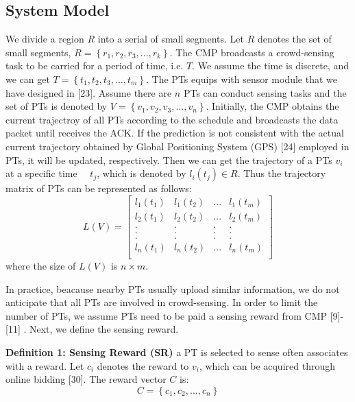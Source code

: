\documentclass[journal]{IEEEtran}
\begin{document}
\subsection{System Model }
 We divide a region $R$ into a serial of small segments. Let $R$ denotes the set of small segments, $R=\left \{ r_{1},r_{2},r_{3},...,r_{k} \right \}$. The CMP broadcasts a crowd-sensing task to be carried for a period of time, i.e. $T$. We assume the time is discrete, and we can get $T=\left \{ t_{1},t_{2},t_{3},...,t_{m} \right \}$. The PTs equips with sensor module that we have designed in [23]. Assume there are $n$ PTs can conduct sensing tasks and the set of PTs is denoted by $V=\left \{ v_{1},v_{2},v_{3},...,v_{n}\right \}$. Initially, the CMP obtains the current trajectroy of all PTs according to the schedule and broadcasts the data packet until receives the ACK. If the prediction is not consistent with the actual current trajectory obtained by Global Positioning System (GPS) [24] employed in PTs, it will be updated, respectively. Then we can get the trajectory of a PTs $v_{i}$ at a specific time　 $t_{j}$, which is denoted by  $l_{i}(t_{j})\in R$. Thus the trajectory matrix of PTs can be represented as follows:
\setcounter{equation}{0}
\begin{equation}
L(V)=\begin{bmatrix}
l_{1}(t_{1})&l_{1}(t_{2})&... & l_{1}(t_{m})\\ 
l_{2}(t_{1})&l_{2}(t_{2})&... & l_{2}(t_{m})\\
.&. &.&.\\ 
.&. &.&.\\
.&. &.&.\\
l_{n}(t_{1})&l_{n}(t_{2})&... & l_{n}(t_{m})\\
\end{bmatrix}
\end{equation}
where the size of $L(V)$ is $n\times m$.


In practice, beacause nearby PTs usually upload similar information, we do not anticipate that all PTs are involved in crowd-sensing. In order to limit the number of PTs, we assume PTs need to be paid a sensing reward from CMP [9]-[11] . Next, we define the sensing reward.

\noindent
\textbf{Definition 1: Sensing Reward (SR)} a PT is selected to sense often associates with a reward. Let $c_{i}$ denotes the reward to $v_{i}$, which can be acquired through online bidding [30]. The reward vector $C$ is:
\begin{equation}
C=\left \{c_{1},c_{2},...,c_{n} \right \}
\end{equation}
\end{document}
